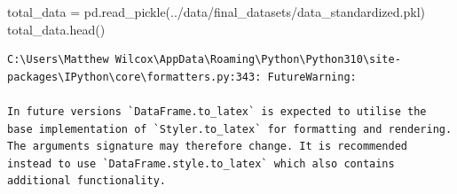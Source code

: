 \documentclass[
  letterpaper,
  DIV=11,
  numbers=noendperiod]{scrartcl}
\newenvironment{Shaded}{\begin{snugshade}}{\end{snugshade}}
\newcommand{\NormalTok}[1]{\textcolor[rgb]{0.00,0.23,0.31}{#1}}
\newcommand{\OperatorTok}[1]{\textcolor[rgb]{0.37,0.37,0.37}{#1}}
\newcommand{\StringTok}[1]{\textcolor[rgb]{0.13,0.47,0.30}{#1}}
\begin{document}
\begin{Shaded}
\begin{Highlighting}[]
\NormalTok{total\_data }\OperatorTok{=}\NormalTok{ pd.read\_pickle(}\StringTok{\textquotesingle{}../data/final\_datasets/data\_standardized.pkl\textquotesingle{}}\NormalTok{)}
\NormalTok{total\_data.head()}
\end{Highlighting}
\end{Shaded}

\begin{verbatim}
C:\Users\Matthew Wilcox\AppData\Roaming\Python\Python310\site-packages\IPython\core\formatters.py:343: FutureWarning:

In future versions `DataFrame.to_latex` is expected to utilise the base implementation of `Styler.to_latex` for formatting and rendering. The arguments signature may therefore change. It is recommended instead to use `DataFrame.style.to_latex` which also contains additional functionality.
\end{verbatim}
\end{document}
